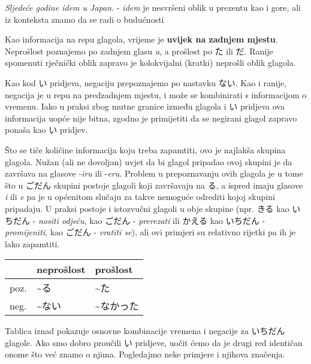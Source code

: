 	\vspace{5pt}
	\hspace{10pt} \textit{Sljedeće godine idem u Japan.} - \textit{idem} je nesvršeni oblik u prezentu kao i gore, ali iz konteksta znamo da se radi o budućnosti
	
	\vspace{5pt}
	Kao informacija na repu glagola, vrijeme je \textbf{uvijek na zadnjem mjestu}. Neprošlost poznajemo po zadnjem glasu \textit{u}, a prošlost po た ili だ. Ranije spomenuti rječnički oblik zapravo je kolokvijalni (kratki) neprošli oblik glagola.
	
	
	Kao kod い pridjeva, negaciju prepoznajemo po nastavku ない. Kao i ranije, negacija je u repu na predzadnjem mjestu, i može se kombinirati s informacijom o vremenu. Iako u praksi zbog mutne granice između glagola i い pridjeva ova informacija uopće nije bitna, zgodno je primijetiti da se negirani glagol zapravo ponaša kao い pridjev.
	
	\newpage
	
	Što se tiče količine informacija koju treba zapamtiti, ovo je najlakša skupina glagola. Nužan (ali ne dovoljan) uvjet da bi glagol pripadao ovoj skupini je da završava na glasove -\textit{iru} ili -\textit{eru}. Problem u prepoznavanju ovih glagola je u tome što u ごだん skupini postoje glagoli koji završavaju na る, a ispred imaju glasove \textit{i} ili \textit{e} pa je u općenitom slučaju za takve nemoguće odrediti kojoj skupini pripadaju. U praksi postoje i istozvučni glagoli u obje skupine (npr. きる kao いちだん - \textit{nositi odjeću}, kao ごだん - \textit{prerezati} ili かえる kao いちだん - \textit{promijeniti}, kao ごだん - \textit{vratiti se}), ali ovi primjeri su relativno rijetki pa ih je lako zapamtiti.
	
	\begin{table}[h]
		\centering
		\begin{tabular}{l l l}\toprule[2pt]
			& neprošlost & prošlost\\
			\midrule
			poz. & \textasciitilde る & \textasciitilde た\\
			neg. & \textasciitilde ない & \textasciitilde なかった\\
			\bottomrule[2pt]
		\end{tabular}
	\end{table}

	Tablica iznad pokazuje osnovne kombinacije vremena i negacije za いちだん glagole. Ako smo dobro proučili い pridjeve, uočit ćemo da je drugi red identičan onome što već znamo o njima. Pogledajmo neke primjere i njihova značenja.
	
